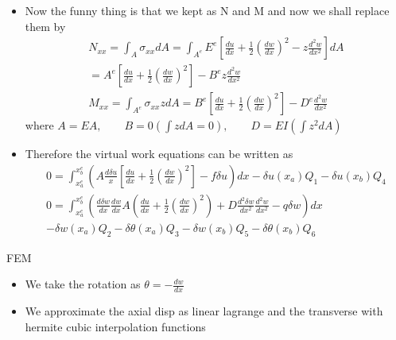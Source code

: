 	\begin{frame}
		\begin{itemize}
			\item Now the funny thing is that we kept as N and M and now we shall replace them by 
			\begin{equation}
				\begin{aligned}
					N_{xx} = \int_A \sigma_{xx} dA = \int_{A^e} E^e \left[\frac{du}{dx} + \frac{1}{2}(\frac{dw}{dx})^2 - z\frac{d^2w}{dx^2} \right] dA \\
					= A^e \left[\frac{du}{dx} + \frac{1}{2}(\frac{dw}{dx})^2 \right] - B^e z\frac{d^2w}{dx^2}\\
					M_{xx} = \int_{A^e} \sigma_{xx} z dA = B^e  \left[\frac{du}{dx} + \frac{1}{2}(\frac{dw}{dx})^2 \right] - D^e \frac{d^2w}{dx^2}
				\end{aligned}
			\end{equation}
			where $A = EA,\qquad B = 0 \left(\int z dA = 0 \right) ,\qquad D = EI \left(\int z^2 dA \right)$
			\item Therefore the virtual work equations can be written as
			\begin{equation}
			\begin{aligned}
				0 = \int_{x_a^e}^{x_b^e} \left( A \frac{d\delta u}{x} \left[\frac{du}{dx} + \frac{1}{2}\left(\frac{dw}{dx} \right)^2 \right] -f\delta u\right) dx - \delta u(x_a)Q_1 - \delta u(x_b)Q_4 \\
				0 = \int_{x_a^e}^{x_b^e} \left( \frac{d\delta w}{dx}\frac{dw}{dx}A \left(\frac{du}{dx} + \frac{1}{2}\left(\frac{dw}{dx} \right)^2 \right) + D \frac{d^2 \delta w}{dx^2} \frac{d^2w}{dx^2} - q\delta w  \right) dx  \\ - \delta w(x_a) Q_2 - \delta \theta(x_a)Q_3 - \delta w(x_b) Q_5- \delta \theta(x_b)Q_6 
			\end{aligned}
			\end{equation}
		\end{itemize}
	\end{frame}


	\begin{frame}{FEM}
		\begin{itemize}
			\item We take the rotation as $\theta = - \frac{dw}{dx}$
			\item  We approximate the axial disp as linear lagrange and the transverse with hermite cubic interpolation functions 
		\end{itemize}
	\end{frame}


